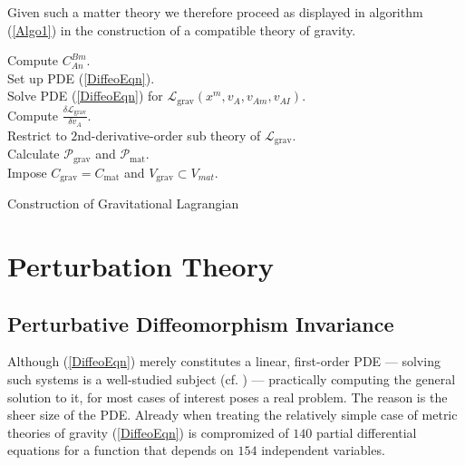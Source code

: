 \documentclass[%
preprint,
nofootinbib,
amsmath,amssymb,
aps,
prd,
floatfix,
]{revtex4-2}
\begin{document}
Given such a matter theory we therefore proceed as displayed in algorithm (\ref{Algo1}) in the construction of a compatible theory of gravity.
\begin{algorithm}[hbt!]
\SetAlgoLined
{}
Compute $C^{Bm}_{An}$. \\
Set up PDE (\ref{DiffeoEqn}). \\
Solve PDE (\ref{DiffeoEqn}) for $\mathcal{L}_{\text{grav}}(x^m,v_A,v_{Am},v_{AI})$.\\
Compute $\frac{\delta \mathcal{L}_{\text{grav}}}{\delta v_A}$.\\
Restrict to $2$nd-derivative-order sub theory of $\mathcal{L}_{\text{grav}}$.\\
Calculate $\mathcal{P}_{\text{grav}}$ and $\mathcal{P}_{\text{mat}}$.\\
Impose $C_{\text{grav}} = C_{\text{mat}}$ and $V_{\text{grav}} \subset V_{mat}.$
 \caption{Construction of Gravitational Lagrangian}\label{Algo1}
\end{algorithm}
\section{Perturbation Theory}\label{chapter2}
\subsection{Perturbative Diffeomorphism Invariance}
Although (\ref{DiffeoEqn}) merely constitutes a linear, first-order PDE --- solving such systems is a well-studied subject (cf. \cite{Hilbert}) --- practically computing the general solution to it, for most cases of interest poses a real problem. The reason is the sheer size of the PDE. Already when treating the relatively simple case of metric theories of gravity (\ref{DiffeoEqn}) is compromized of $140$ partial differential equations for a function that depends on $154$ independent variables.
\end{document}
